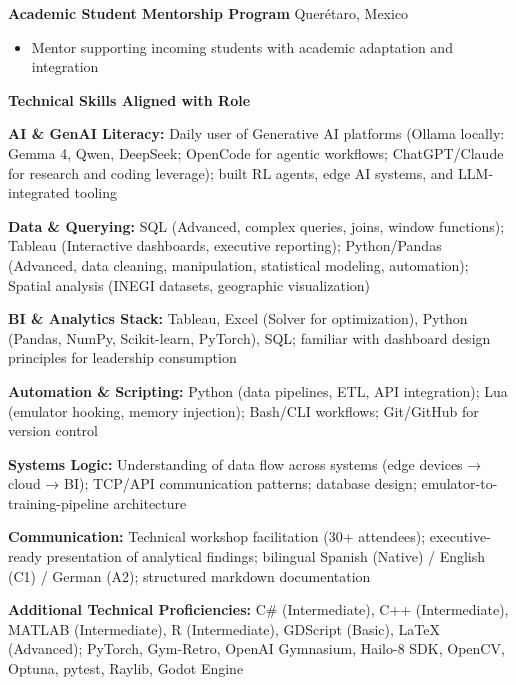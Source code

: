 \documentclass[11pt]{article}
\begin{document}
\vspace{6pt}

\textbf{Academic Student Mentorship Program} \hfill Querétaro, Mexico
\begin{itemize}[noitemsep, topsep=0pt, partopsep=0pt, parsep=0pt]
    \item Mentor supporting incoming students with academic adaptation and integration
\end{itemize}

\vspace{12pt}

\begin{center}
    \textbf{Technical Skills Aligned with Role}
\end{center}

\textbf{AI \& GenAI Literacy:} Daily user of Generative AI platforms (Ollama locally: Gemma 4, Qwen, DeepSeek; OpenCode for agentic workflows; ChatGPT/Claude for research and coding leverage); built RL agents, edge AI systems, and LLM-integrated tooling

\textbf{Data \& Querying:} SQL (Advanced, complex queries, joins, window functions); Tableau (Interactive dashboards, executive reporting); Python/Pandas (Advanced, data cleaning, manipulation, statistical modeling, automation); Spatial analysis (INEGI datasets, geographic visualization)

\textbf{BI \& Analytics Stack:} Tableau, Excel (Solver for optimization), Python (Pandas, NumPy, Scikit-learn, PyTorch), SQL; familiar with dashboard design principles for leadership consumption

\textbf{Automation \& Scripting:} Python (data pipelines, ETL, API integration); Lua (emulator hooking, memory injection); Bash/CLI workflows; Git/GitHub for version control

\textbf{Systems Logic:} Understanding of data flow across systems (edge devices → cloud → BI); TCP/API communication patterns; database design; emulator-to-training-pipeline architecture

\textbf{Communication:} Technical workshop facilitation (30+ attendees); executive-ready presentation of analytical findings; bilingual Spanish (Native) / English (C1) / German (A2); structured markdown documentation

\vspace{6pt}

\textbf{Additional Technical Proficiencies:} C\# (Intermediate), C++ (Intermediate), MATLAB (Intermediate), R (Intermediate), GDScript (Basic), LaTeX (Advanced); PyTorch, Gym-Retro, OpenAI Gymnasium, Hailo-8 SDK, OpenCV, Optuna, pytest, Raylib, Godot Engine
\end{document}
